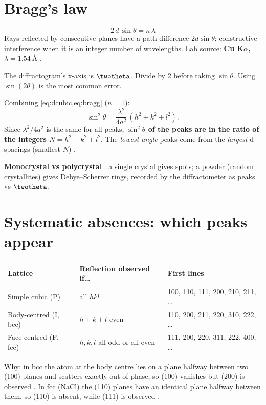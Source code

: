 \section{Bragg's law}
\begin{keybox}
\begin{equation}
\boxed{2\,d\,\sin\theta = n\,\lambda}
\label{eq:bragg}
\end{equation}
Rays reflected by consecutive planes have a path difference $2d\sin\theta$; constructive interference when it is an
integer number of wavelengths. Lab source: \textbf{Cu K$\alpha$, $\lambda = \SI{1.54}{\angstrom}$} .
\end{keybox}
\begin{pitfall}
The diffractogram's x-axis is $\twotheta$. Divide by 2 before taking $\sin\theta$. Using $\sin(2\theta)$ is the most
common error.
\end{pitfall}
Combining \cref{eq:dcubic,eq:bragg} ($n=1$):
\begin{equation}
\sin^2\theta = \frac{\lambda^2}{4a^2}\,(h^2+k^2+l^2).
\label{eq:sin2}
\end{equation}
Since $\lambda^2/4a^2$ is the same for all peaks, \textbf{$\sin^2\theta$ of the peaks are in the ratio of the integers
$N = h^2+k^2+l^2$}. The \emph{lowest-angle} peaks come from the \emph{largest} d-spacings (smallest $N$) .

\textbf{Monocrystal vs polycrystal} : a single crystal gives spots; a powder (random crystallites) gives
Debye--Scherrer rings, recorded by the diffractometer as peaks vs $\twotheta$.

\section{Systematic absences: which peaks appear}
\begin{keybox}
\begin{center}
\begin{tabular}{@{}lll@{}}
\toprule
Lattice & Reflection observed if\ldots & First lines \\ \midrule
Simple cubic (P) & all $hkl$ & 100, 110, 111, 200, 210, 211, \ldots \\
Body-centred (I, bcc) & $h+k+l$ even & 110, 200, 211, 220, 310, 222, \ldots \\
Face-centred (F, fcc) & $h,k,l$ all odd or all even & 111, 200, 220, 311, 222, 400, \ldots \\
\bottomrule
\end{tabular}
\end{center}
Why: in bcc the atom at the body centre lies on a plane halfway between two (100) planes and scatters exactly out of
phase, so (100) vanishes but (200) is observed . In fcc (NaCl) the (110) planes have an identical plane
halfway between them, so (110) is absent, while (111) is observed .
\end{keybox}

